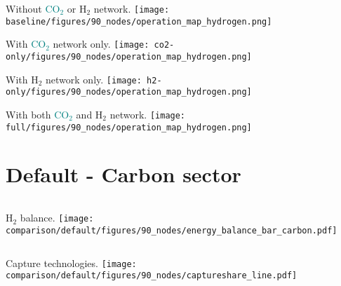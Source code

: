 \documentclass[12pt, aspectratio=169]{beamer}
\newcommand{\carbon}{\textcolor{teal}{CO$_2$}}
\newcommand{\hydrogen}{H$_2$}
\begin{document}
\begin{frame}
    \begin{center}
    Without \carbon{} or \hydrogen{} network.
    \texttt{[image: baseline/figures/90\_nodes/operation\_map\_hydrogen.png]}
    \end{center}
\end{frame}


\begin{frame}
    \begin{center}
    With \carbon{} network only.
    \texttt{[image: co2-only/figures/90\_nodes/operation\_map\_hydrogen.png]}
    \end{center}
\end{frame}

\begin{frame}
    \begin{center}
    With \hydrogen{} network only.
    \texttt{[image: h2-only/figures/90\_nodes/operation\_map\_hydrogen.png]}
    \end{center}
\end{frame}


\begin{frame}
    \begin{center}
    With both \carbon{}  and \hydrogen{} network.
    \texttt{[image: full/figures/90\_nodes/operation\_map\_hydrogen.png]}
    \end{center}
\end{frame}






\section*{Default - Carbon sector}

\begin{frame}
    \begin{columns}
        \hydrogen{} balance.
        \texttt{[image: comparison/default/figures/90\_nodes/energy\_balance\_bar\_carbon.pdf]}
    \end{columns}
\end{frame}

\begin{frame}
    \begin{columns}
        Capture technologies.
        \texttt{[image: comparison/default/figures/90\_nodes/captureshare\_line.pdf]}
    \end{columns}
\end{frame}
\end{document}
